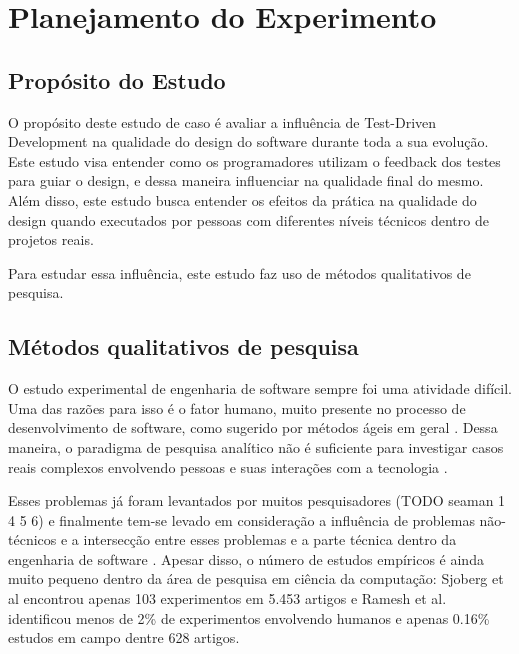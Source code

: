 \chapter{Planejamento do Experimento}
\label{cap:planejamento}

\section{Propósito do Estudo} 
\label{sec:planejamento-proposito}

O propósito deste estudo de caso é avaliar a influência de Test-Driven Development na qualidade do 
design do software durante toda a sua evolução. Este estudo visa entender como os programadores utilizam o 
feedback dos testes para guiar o design, e dessa maneira influenciar na qualidade final do mesmo. 
Além disso, este estudo busca entender os efeitos da prática na qualidade do design quando executados 
por pessoas com diferentes níveis técnicos dentro de projetos reais.

Para estudar essa influência, este estudo faz uso de métodos qualitativos de pesquisa.

\section{Métodos qualitativos de pesquisa} 
\label{sec:planejamento-qualitativa}

O estudo experimental de engenharia de software sempre foi uma atividade difícil. Uma das razões para isso é o
fator humano, muito presente no processo de desenvolvimento de software, como sugerido por métodos ágeis em geral \cite{AgileManifesto}. 
Dessa maneira, o paradigma de pesquisa analítico não é suficiente para investigar casos reais complexos envolvendo pessoas
e suas interações com a tecnologia \cite{guidelines-case-study}.

Esses problemas já foram levantados por muitos pesquisadores (TODO seaman 1 4 5 6) e finalmente tem-se 
levado em consideração a influência de problemas não-técnicos e a intersecção entre esses problemas e a parte técnica 
dentro da engenharia de software \cite{seaman}.
Apesar disso, o número de estudos empíricos é ainda muito pequeno dentro da área de pesquisa em ciência da computação: 
Sjoberg et al \cite{sjoberg} encontrou apenas 103 experimentos em 5.453 artigos e Ramesh et al. \cite{ramesh} 
identificou menos de 2\% de experimentos envolvendo humanos e apenas 0.16\% estudos em campo dentre 628 artigos.

